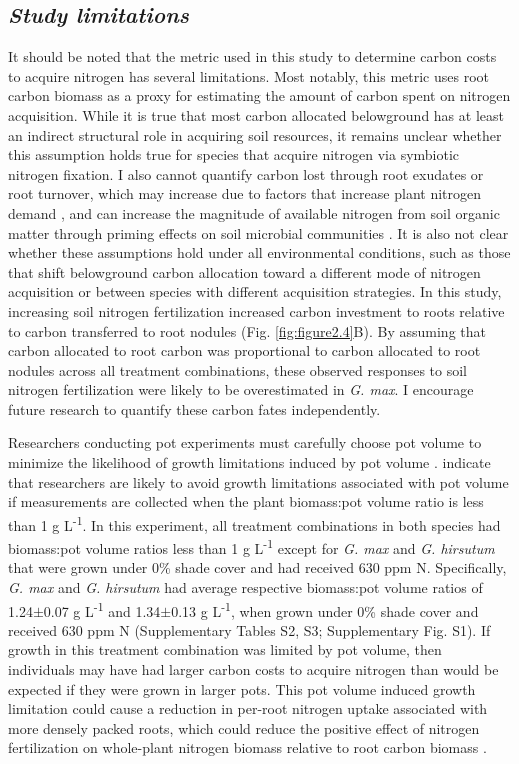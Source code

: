 \subsection{\textit{Study limitations}}
It should be noted that the metric used in this study to determine carbon costs to acquire nitrogen has several limitations. Most notably, this metric uses root carbon biomass as a proxy for estimating the amount of carbon spent on nitrogen acquisition. While it is true that most carbon allocated belowground has at least an indirect structural role in acquiring soil resources, it remains unclear whether this assumption holds true for species that acquire nitrogen via symbiotic nitrogen fixation. I also cannot quantify carbon lost through root exudates or root turnover, which may increase due to factors that increase plant nitrogen demand , and can increase the magnitude of available nitrogen from soil organic matter through priming effects on soil microbial communities . It is also not clear whether these assumptions hold under all environmental conditions, such as those that shift belowground carbon allocation toward a different mode of nitrogen acquisition  or between species with different acquisition strategies. In this study, increasing soil nitrogen fertilization increased carbon investment to roots relative to carbon transferred to root nodules (Fig. \ref{fig:figure2.4}B). By assuming that carbon allocated to root carbon was proportional to carbon allocated to root nodules across all treatment combinations, these observed responses to soil nitrogen fertilization were likely to be overestimated in \textit{G. max}. I encourage future research to quantify these carbon fates independently.

Researchers conducting pot experiments must carefully choose pot volume to minimize the likelihood of growth limitations induced by pot volume .  indicate that researchers are likely to avoid growth limitations associated with pot volume if measurements are collected when the plant biomass:pot volume ratio is less than 1 g L\textsuperscript{-1}. In this experiment, all treatment combinations in both species had biomass:pot volume ratios less than 1 g L\textsuperscript{-1} except for \textit{G. max} and \textit{G. hirsutum} that were grown under 0\% shade cover and had received 630 ppm N. Specifically, \textit{G. max} and \textit{G. hirsutum} had average respective biomass:pot volume ratios of 1.24$\pm$0.07 g L\textsuperscript{-1} and 1.34$\pm$0.13 g L\textsuperscript{-1}, when grown under 0\% shade cover and received 630 ppm N (Supplementary Tables S2, S3; Supplementary Fig. S1). If growth in this treatment combination was limited by pot volume, then individuals may have had larger carbon costs to acquire nitrogen than would be expected if they were grown in larger pots. This pot volume induced growth limitation could cause a reduction in per-root nitrogen uptake associated with more densely packed roots, which could reduce the positive effect of nitrogen fertilization on whole-plant nitrogen biomass relative to root carbon biomass .

